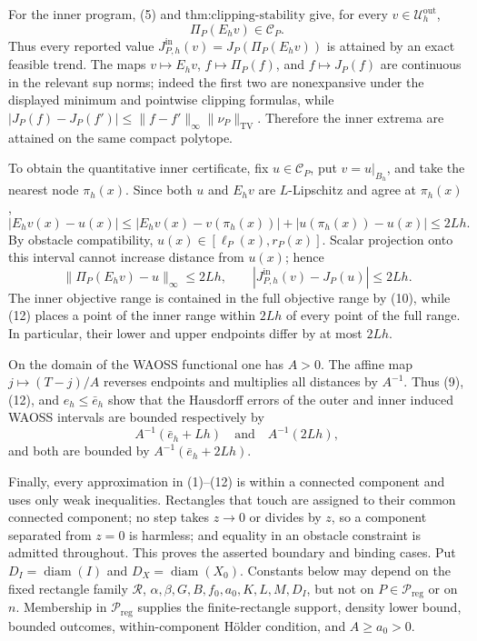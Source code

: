 For the inner program, (5) and \(\text{thm:clipping-stability}\) give, for every \(v\in\mathcal U_h^{\mathrm{out}}\),
\[
 \Pi_P(E_hv)\in\mathcal C_P.                                    \tag{10}
\]
Thus every reported value \(J_{P,h}^{\mathrm{in}}(v)=J_P(\Pi_P(E_hv))\) is attained by an exact feasible trend. The maps \(v\mapsto E_hv\), \(f\mapsto\Pi_P(f)\), and \(f\mapsto J_P(f)\) are continuous in the relevant sup norms; indeed the first two are nonexpansive under the displayed minimum and pointwise clipping formulas, while
\(
 |J_P(f)-J_P(f')|\leq\|f-f'\|_\infty\|\nu_P\|_{\mathrm{TV}}
\).
Therefore the inner extrema are attained on the same compact polytope.

To obtain the quantitative inner certificate, fix \(u\in\mathcal C_P\), put \(v=u|_{B_h}\), and take the nearest node \(\pi_h(x)\). Since both \(u\) and \(E_hv\) are \(L\)-Lipschitz and agree at \(\pi_h(x)\),
\[
 |E_hv(x)-u(x)|
 \leq |E_hv(x)-v(\pi_h(x))|+|u(\pi_h(x))-u(x)|
 \leq2Lh.                                                        \tag{11}
\]
By obstacle compatibility, \(u(x)\in[\ell_P(x),r_P(x)]\). Scalar projection onto this interval cannot increase distance from \(u(x)\); hence
\[
 \|\Pi_P(E_hv)-u\|_\infty\leq2Lh,
 \qquad
 |J_{P,h}^{\mathrm{in}}(v)-J_P(u)|\leq2Lh.                       \tag{12}
\]
The inner objective range is contained in the full objective range by (10), while (12) places a point of the inner range within \(2Lh\) of every point of the full range. In particular, their lower and upper endpoints differ by at most \(2Lh\).

On the domain of the WAOSS functional one has \(A>0\). The affine map \(j\mapsto(T-j)/A\) reverses endpoints and multiplies all distances by \(A^{-1}\). Thus (9), (12), and \(e_h\leq\bar e_h\) show that the Hausdorff errors of the outer and inner induced WAOSS intervals are bounded respectively by
\[
 A^{-1}(\bar e_h+Lh)
 \quad\text{and}\quad
 A^{-1}(2Lh),
\]
and both are bounded by \(A^{-1}(\bar e_h+2Lh)\).

Finally, every approximation in (1)--(12) is within a connected component and uses only weak inequalities. Rectangles that touch are assigned to their common connected component; no step takes \(z\to0\) or divides by \(z\), so a component separated from \(z=0\) is harmless; and equality in an obstacle constraint is admitted throughout. This proves the asserted boundary and binding cases.
Put \(D_I=\operatorname{diam}(I)\) and \(D_X=\operatorname{diam}(X_0)\). Constants below may depend on the fixed rectangle family \(\mathscr R\), \(\alpha,\beta,G,B,f_0,a_0,K,L,M,D_I\), but not on \(P\in\mathcal P_{\mathrm{reg}}\) or on \(n\). Membership in \(\mathcal P_{\mathrm{reg}}\) supplies the finite-rectangle support, density lower bound, bounded outcomes, within-component H\"older condition, and \(A\geq a_0>0\).

